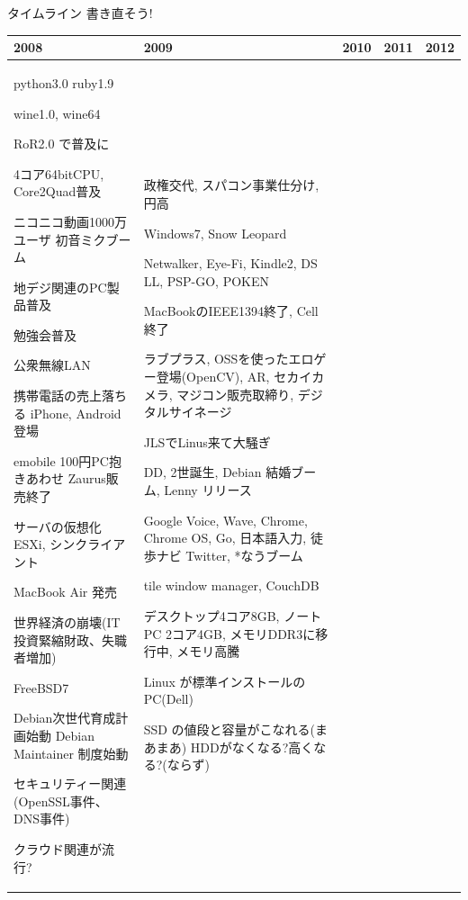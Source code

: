 \begin{frame}{タイムライン 書き直そう!}

{\tiny
\begin{tabular}[t]{|p{8.5em}|p{12em}|p{8em}|p{6em}|p{8em}|}
\hline
2008 &2009 & 2010 & 2011 & 2012 \\
\hline

python3.0
ruby1.9

wine1.0, wine64

RoR2.0 で普及に

4コア64bitCPU, Core2Quad普及

ニコニコ動画1000万ユーザ
初音ミクブーム

地デジ関連のPC製品普及

勉強会普及

公衆無線LAN

携帯電話の売上落ちる
iPhone, Android 登場

emobile 100円PC抱きあわせ
Zaurus販売終了

サーバの仮想化 ESXi, シンクライアント

MacBook Air 発売

世界経済の崩壊(IT投資緊縮財政、失職者増加)

FreeBSD7

Debian次世代育成計画始動
Debian Maintainer 制度始動

セキュリティー関連(OpenSSL事件、DNS事件)

クラウド関連が流行?

&
政権交代, スパコン事業仕分け, 円高

Windows7, Snow Leopard

Netwalker, Eye-Fi, Kindle2, DS LL, PSP-GO, POKEN

MacBookのIEEE1394終了, Cell終了

ラブプラス, OSSを使ったエロゲー登場(OpenCV), AR, セカイカメラ, マジコン販売取締り, デジタルサイネージ

JLSでLinus来て大騒ぎ

DD, 2世誕生, Debian 結婚ブーム, Lenny リリース

Google Voice, Wave, Chrome, Chrome OS, Go, 日本語入力, 徒歩ナビ
Twitter, *なうブーム

tile window manager, CouchDB

デスクトップ4コア8GB, ノートPC 2コア4GB, メモリDDR3に移行中, メモリ高騰

Linux が標準インストールのPC(Dell)

SSD の値段と容量がこなれる(まあまあ)
HDDがなくなる?高くなる?(ならず)


\end{tabular}}
\end{frame}
